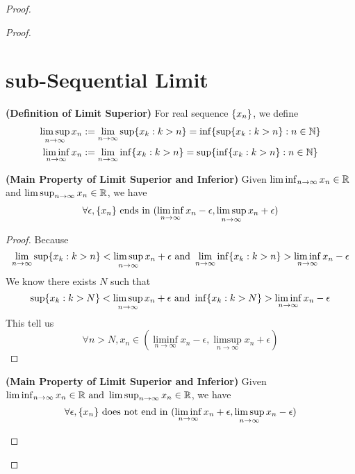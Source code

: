\documentclass{report}
\begin{document}
\begin{proof}
\begin{proof}
\section{sub-Sequential Limit}
\begin{definition}
\label{4.3.1}
\textbf{(Definition of Limit Superior)} For real sequence $\{ x_n \}$, we define
\begin{align}
  \limsup_{n\to\infty} x_n&:=\lim_{n\to\infty} \sup \{ x_k:k>n \}=\inf \{ \sup \{ x_k:k>n \}:n\in\mathbb{N} \}\\
  \liminf_{n\to\infty} x_n&:=\lim_{n\to\infty}\inf \{ x_k:k>n \}=\sup \{ \inf \{ x_k:k>n \}:n\in\mathbb{N} \}
\end{align}
\end{definition}
\begin{theorem}
\label{4.3.2}
\textbf{(Main Property of Limit Superior and Inferior)} 
Given $\liminf_{n\to\infty} x_n\in\mathbb{R}$ and $\limsup_{n\to\infty} x_n\in\mathbb{R}$, we have
\begin{gather}
\forall \epsilon ,\{ x_n \}\text{ ends in }(\liminf_{n\to\infty} x_n-\epsilon ,\limsup_{n\to\infty} x_n+\epsilon )
\end{gather}
\end{theorem}
\begin{proof}
Because 
\begin{equation}
\lim_{n\to\infty}\sup  \{ x_k:k>n \}<\limsup_{n\to\infty} x_n+\epsilon \text{ and }\lim_{n\to\infty}\inf \{ x_k:k>n \}>\liminf_{n\to\infty} x_n-\epsilon 
\end{equation}
We know there exists $N$ such that 
 \begin{equation}
\sup \{ x_k:k>N \}<\limsup_{n\to\infty} x_n+\epsilon \text{ and }\inf \{ x_k:k>N \}>\liminf_{n\to\infty} x_n-\epsilon 
\end{equation}
This tell us
\begin{equation}
\forall n>N, x_n\in (\liminf_{n\to\infty} x_n-\epsilon ,\limsup_{n\to\infty} x_n+\epsilon )
\end{equation}
\end{proof}
\begin{theorem}
\label{4.3.3}
\textbf{(Main Property of Limit Superior and Inferior)} 
Given $\liminf_{n\to\infty} x_n\in\mathbb{R}\text{ and }\limsup_{n\to\infty} x_n\in\mathbb{R}$, we have
\begin{equation}
\forall \epsilon , \set{x_n}\text{ does not end in }(\liminf_{n\to\infty} x_n+\epsilon ,\limsup_{n\to\infty} x_n-\epsilon )

\end{equation}
\end{theorem}
\end{proof}
\end{proof}
\end{document}
